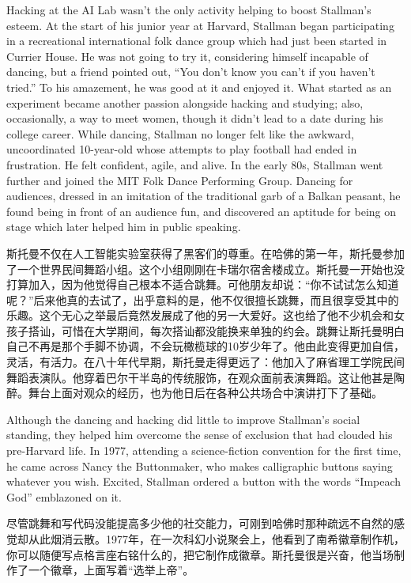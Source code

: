 \ifdefined\eng
Hacking at the AI Lab wasn't the only activity helping to boost Stallman's esteem. At the start of his junior year at Harvard, Stallman began participating in a recreational international folk dance group which had just been started in Currier House. He was not going to try it, considering himself incapable of dancing, but a friend pointed out, ``You don't know you can't if you haven't tried.'' To his amazement, he was good at it and enjoyed it. What started as an experiment became another passion alongside hacking and studying; also, occasionally, a way to meet women, though it didn't lead to a date during his college career.  While dancing, Stallman no longer felt like the awkward, uncoordinated 10-year-old whose attempts to play football had ended in frustration. He felt confident, agile, and alive. In the early 80s, Stallman went further and joined the MIT Folk Dance Performing Group.   Dancing for audiences, dressed in an imitation of the traditional garb of a Balkan peasant, he found being in front of an audience fun, and discovered an aptitude for being on stage which later helped him in public speaking.
\fi

\ifdefined\chs
斯托曼不仅在人工智能实验室获得了黑客们的尊重。在哈佛的第一年，斯托曼参加了一个世界民间舞蹈小组。这个小组刚刚在卡瑞尔宿舍楼成立。斯托曼一开始也没打算加入，因为他觉得自己根本不适合跳舞。可他朋友却说：``你不试试怎么知道呢？''后来他真的去试了，出乎意料的是，他不仅很擅长跳舞，而且很享受其中的乐趣。这个无心之举最后竟然发展成了他的另一大爱好。这也给了他不少机会和女孩子搭讪，可惜在大学期间，每次搭讪都没能换来单独的约会。跳舞让斯托曼明白自己不再是那个手脚不协调，不会玩橄榄球的10岁少年了。他由此变得更加自信，灵活，有活力。在八十年代早期，斯托曼走得更远了：他加入了麻省理工学院民间舞蹈表演队。他穿着巴尔干半岛的传统服饰，在观众面前表演舞蹈。这让他甚是陶醉。舞台上面对观众的经历，也为他日后在各种公共场合中演讲打下了基础。
\fi

\ifdefined\eng
Although the dancing and hacking did little to improve Stallman's social standing, they helped him overcome the sense of exclusion that had clouded his pre-Harvard life. In 1977, attending a science-fiction convention for the first time, he came across Nancy the Buttonmaker, who makes calligraphic buttons saying whatever you wish. Excited, Stallman ordered a button with the words ``Impeach God'' emblazoned on it.
\fi

\ifdefined\chs
尽管跳舞和写代码没能提高多少他的社交能力，可刚到哈佛时那种疏远不自然的感觉却从此烟消云散。1977年，在一次科幻小说聚会上，他看到了南希徽章制作机，你可以随便写点格言座右铭什么的，把它制作成徽章。斯托曼很是兴奋，他当场制作了一个徽章，上面写着``选举上帝''。
\fi

